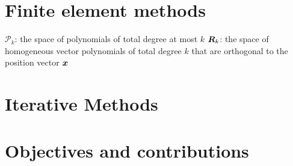 \section{Finite element methods}
${\mathcal P}_{k}$: the space of polynomials of total degree at most $k$
$ \boldsymbol R_k$: the space of homogeneous vector polynomials of total degree $k$ that are orthogonal to the position vector $\boldsymbol x$

\section{Iterative Methods}

\section{Objectives and contributions}





